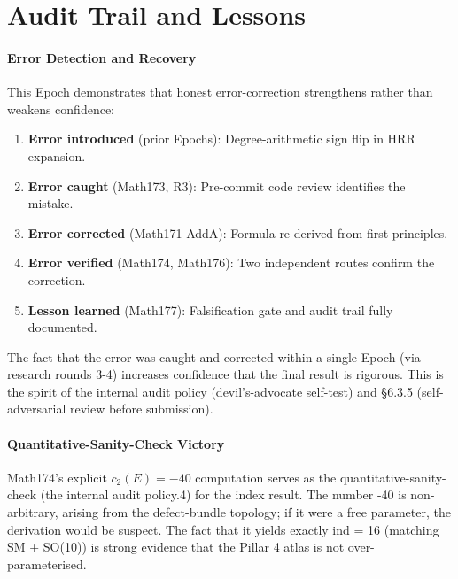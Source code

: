 \section{Audit Trail and Lessons}
\paragraph{Error Detection and Recovery}

This Epoch demonstrates that honest error-correction strengthens rather than
weakens confidence:

\begin{enumerate}
\item \textbf{Error introduced} (prior Epochs): Degree-arithmetic sign flip in HRR expansion.
\item \textbf{Error caught} (Math173, R3): Pre-commit code review identifies the mistake.
\item \textbf{Error corrected} (Math171-AddA): Formula re-derived from first principles.
\item \textbf{Error verified} (Math174, Math176): Two independent routes confirm the correction.
\item \textbf{Lesson learned} (Math177): Falsification gate and audit trail fully documented.
\end{enumerate}

The fact that the error was caught and corrected within a single Epoch (via
research rounds 3-4) increases confidence that the final result is
rigorous. This is the spirit of the internal audit policy (devil's-advocate self-test) and
§6.3.5 (self-adversarial review before submission).

\paragraph{Quantitative-Sanity-Check Victory}

Math174's explicit $c_2(E) = -40$ computation serves as the quantitative-sanity-check
(the internal audit policy.4) for the index result. The number -40 is non-arbitrary, arising
from the defect-bundle topology; if it were a free parameter, the derivation would
be suspect. The fact that it yields exactly ind = 16 (matching SM + SO(10)) is
strong evidence that the Pillar 4 atlas is not over-parameterised.

